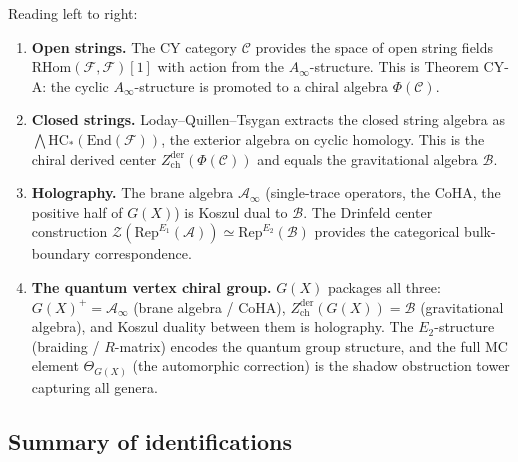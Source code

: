 \documentclass[11pt]{article}
\theoremstyle{definition}
\theoremstyle{remark}
\newcommand{\RHom}{\mathrm{RHom}}
\newcommand{\End}{\mathrm{End}}
\newcommand{\HC}{\mathrm{HC}}
\newcommand{\Ainf}{A_\infty}
\newcommand{\Rep}{\mathrm{Rep}}
\newcommand{\cA}{\mathcal{A}}
\newcommand{\cB}{\mathcal{B}}
\newcommand{\cC}{\mathcal{C}}
\newcommand{\cF}{\mathcal{F}}
\newcommand{\cZ}{\mathcal{Z}}
\begin{document}
Reading left to right:

\begin{enumerate}[label=\textbf{(\arabic*)}]
 \item \textbf{Open strings.} The CY category $\cC$ provides the space of
 open string fields $\RHom(\cF, \cF)[1]$ with action from the $\Ainf$-structure. This is Theorem CY-A: the cyclic $\Ainf$-structure is promoted to a chiral algebra $\Phi(\cC)$.

 \item \textbf{Closed strings.} Loday--Quillen--Tsygan extracts the closed
 string algebra as $\bigwedge \HC_*(\End(\cF))$, the exterior algebra
 on cyclic homology. This is the chiral derived center
 $Z^{\mathrm{der}}_{\mathrm{ch}}(\Phi(\cC))$ and equals the gravitational
 algebra $\cB$.

 \item \textbf{Holography.} The brane algebra $\cA_\infty$ (single-trace
 operators, the CoHA, the positive half of $G(X)$) is Koszul dual to $\cB$.
 The Drinfeld center construction
 $\cZ(\Rep^{E_1}(\cA)) \simeq \Rep^{E_2}(\cB)$
 provides the categorical bulk-boundary correspondence.

 \item \textbf{The quantum vertex chiral group.} $G(X)$ packages all three:
 $G(X)^+ = \cA_\infty$ (brane algebra / CoHA),
 $Z^{\mathrm{der}}_{\mathrm{ch}}(G(X)) = \cB$ (gravitational algebra),
 and Koszul duality between them is holography. The $E_2$-structure
 (braiding / $R$-matrix) encodes the quantum group structure, and the full
 MC element $\Theta_{G(X)}$ (the automorphic correction) is the shadow obstruction tower
 capturing all genera.
\end{enumerate}

\subsection{Summary of identifications}
\end{document}
